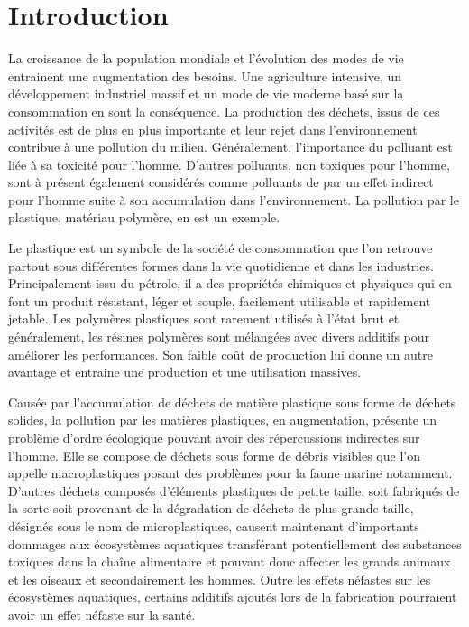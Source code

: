 \section{Introduction}

\par{
La croissance de la population mondiale et l'\'evolution des modes de vie entrainent une augmentation des besoins. Une agriculture intensive, un d\'eveloppement industriel massif et un mode de vie moderne bas\'e sur la consommation en sont la cons\'equence. La production des d\'echets, issus de ces activit\'es est de plus en plus importante et leur rejet dans l'environnement contribue \`a une pollution du milieu. G\'en\'eralement, l'importance du polluant est li\'ee \`a sa toxicit\'e pour l'homme. D'autres polluants, non toxiques pour l'homme, sont \`a pr\'esent \'egalement consid\'er\'es comme polluants de par un effet indirect pour l'homme suite \`a son accumulation dans l'environnement. La pollution par le plastique, mat\'eriau polym\`ere, en est un exemple.
}\\
\par{
Le plastique est un symbole de la soci\'et\'e de consommation que l'on retrouve partout sous diff\'erentes formes dans la vie quotidienne et dans les industries. Principalement issu du p\'etrole, il a des propri\'et\'es chimiques et physiques qui en font un produit r\'esistant, l\'eger et souple,  facilement utilisable et rapidement jetable. Les polym\`eres plastiques sont rarement utilis\'es \`a l'\'etat brut  et g\'en\'eralement, les r\'esines polym\`eres sont m\'elang\'ees avec divers additifs pour am\'eliorer les performances. Son faible co\^ut de production lui donne un autre avantage et entraine une production et une utilisation massives.
}\\
\par{
Caus\'ee par l'accumulation de d\'echets de mati\`ere plastique sous forme de d\'echets solides, la pollution par les mati\`eres plastiques, en augmentation, pr\'esente un probl\`eme d'ordre \'ecologique pouvant avoir des r\'epercussions indirectes sur l'homme. Elle se compose de d\'echets sous forme de d\'ebris visibles que l'on appelle macroplastiques posant des probl\`emes pour la faune marine notamment. D'autres d\'echets compos\'es d'\'el\'ements plastiques de petite taille, soit fabriqu\'es de la sorte soit provenant de la d\'egradation de d\'echets de plus grande taille, d\'esign\'es sous le nom de microplastiques, causent maintenant d'importants dommages aux \'ecosyst\`emes aquatiques transf\'erant potentiellement des substances toxiques dans la cha\^ine alimentaire et pouvant donc affecter les grands animaux et les oiseaux et secondairement les hommes. Outre les effets n\'efastes sur les \'ecosyst\`emes aquatiques, certains additifs ajout\'es lors de la fabrication pourraient avoir un effet n\'efaste sur la sant\'e. 
}\\
